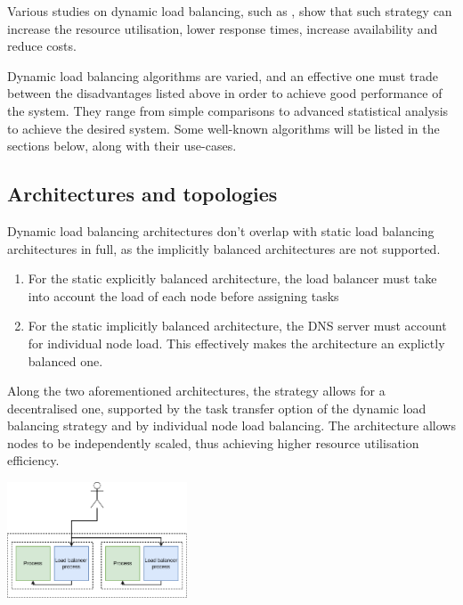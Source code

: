 \documentclass[conference]{IEEEtran}
\begin{document}
    Various studies on dynamic load balancing, such as \cite{b1}, show that such strategy can increase the resource utilisation,
lower response times, increase availability and reduce costs. 

    Dynamic load balancing algorithms are varied, and an effective one must trade between the disadvantages listed above in
order to achieve good performance of the system. They range from simple comparisons to advanced statistical analysis to achieve
the desired system. Some well-known algorithms will be listed in the sections below, along with their use-cases.

\subsection{Architectures and topologies}
    Dynamic load balancing architectures don't overlap with static load balancing architectures in full, as the implicitly
balanced architectures are not supported.
    
    \begin{enumerate}
        \item For the static explicitly balanced architecture, the load balancer must take into account the load of each node before assigning tasks
        \item For the static implicitly balanced architecture, the DNS server must account for individual node load. This effectively makes the
        architecture an explictly balanced one.
    \end{enumerate}

    Along the two aforementioned architectures, the strategy allows for a decentralised one, supported by the task transfer
option of the dynamic load balancing strategy and by individual node load balancing. The architecture allows nodes to be independently scaled,
thus achieving higher resource utilisation efficiency.

    \begin{center}
        \vspace{1em}
        \includegraphics[width=0.4\textwidth]{internally-load-balanced-node.png}
         \label{internally-load-balanced-node}
        \vspace{1em}
    \end{center}
\end{document}
